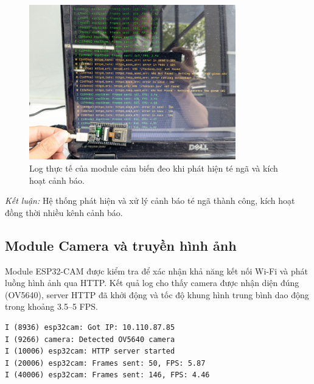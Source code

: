 \begin{figure}[H]
    \centering
    \includegraphics[width=0.8\textwidth]{figures/module2_real_log.jpg}
    \caption{Log thực tế của module cảm biến đeo khi phát hiện té ngã và kích hoạt cảnh báo.}
    \label{fig:module2_real_log}
\end{figure}

\textit{Kết luận:} Hệ thống phát hiện và xử lý cảnh báo té ngã thành công, kích hoạt đồng thời nhiều kênh cảnh báo.

\subsection{Module Camera và truyền hình ảnh}
Module ESP32-CAM được kiểm tra để xác nhận khả năng kết nối Wi-Fi và phát luồng hình ảnh qua HTTP.  
Kết quả log cho thấy camera được nhận diện đúng (OV5640), server HTTP đã khởi động và tốc độ khung hình trung bình dao động trong khoảng 3.5–5 FPS.

\begin{verbatim}
I (8936) esp32cam: Got IP: 10.110.87.85
I (9266) camera: Detected OV5640 camera
I (10006) esp32cam: HTTP server started
I (20006) esp32cam: Frames sent: 50, FPS: 5.87
I (40006) esp32cam: Frames sent: 146, FPS: 4.46
\end{verbatim}

